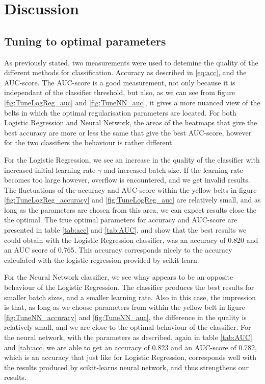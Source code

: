 \section{Discussion}
\label{sec:discussion}

\subsection{Tuning to optimal parameters}
As previously stated, two measurements were used to detemine the quality of the different methods for classification. Accuracy as described in \eqref{eq:acc}, and the AUC-score. The AUC-score is a good measurement, not only because it is independant of the classifier threshold, but also, as we can see from figure \ref{fig:TuneLogReg_auc} and \ref{fig:TuneNN_auc}, it gives a more nuanced view of the belts in which the optimal regularisation parameters are located. For both Logistic Regression and Neural Network, the areas of the heatmaps that give the best accuracy are more or less the same that give the best AUC-score, however for the two classifiers the behaviour is rather different.

For the Logistic Regression, we see an increase in the quality of the classifier with increased initial learning rate $\gamma$ and increased batch size. If the learning rate becomes too large however, overflow is encountered, and we get invalid results. The fluctuations of the accuracy and AUC-score within the yellow belts in figure \ref{fig:TuneLogReg_accuracy} and \ref{fig:TuneLogReg_auc} are relatively small, and as long as the parameters are chosen from this area, we can expect results close the the optimal. The true optimal parameters for accuracy and AUC-score are presented in table \ref{tab:acc} and \ref{tab:AUC}, and show that the best results we could obtain with the Logistic Regression classifier, was an accuracy of 0.820 and an AUC score of 0.765. This accuracy corresponds nicely to the accuracy calculated with the logistic regression provided by scikit-learn.

For the Neural Network classifier, we see whay appears to be an opposite behaviour of the Logistic Regression. The classifier produces the best results for smaller batch sizes, and a smaller learning rate. Also in this case, the impression is that, as long as we choose parameters from within the yellow belt in figure \ref{fig:TuneNN_accuracy} and \ref{fig:TuneNN_auc}, the difference in the quality is relatively small, and we are close to the optimal behaviour of the classifier. For the neural network, with the parameters as described, again in table \ref{tab:AUC} and \ref{tab:acc} we are able to get an accuracy of 0.823 and an AUC-score of 0.782, which is an accuracy that just like for Logistic Regression, corresponds well with the results produced by scikit-learns neural network, and thus strengthens our results.

